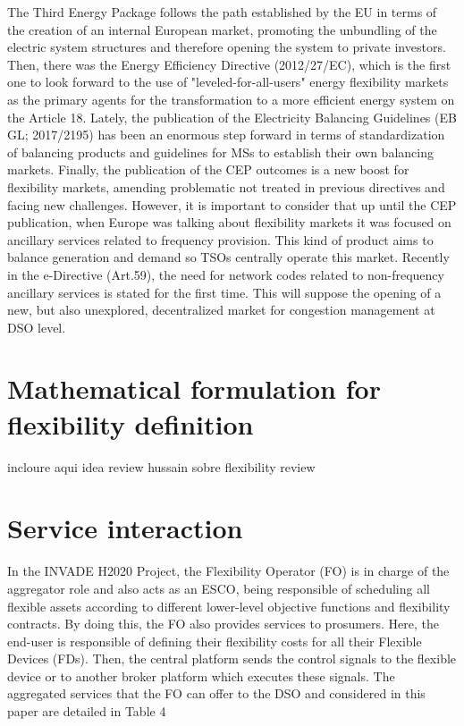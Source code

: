 The Third Energy Package follows the path established by the EU in terms of the creation of
an internal European market, promoting the unbundling of the electric system structures and therefore opening the system to private investors. Then, there was the Energy Efficiency Directive
(2012/27/EC), which is the first one to look forward to the use of "leveled-for-all-users"
energy flexibility markets as the primary agents for the transformation to a more efficient energy
system on the Article 18. Lately, the publication of the Electricity Balancing Guidelines (EB
GL; 2017/2195) has been an enormous step forward in terms of standardization of balancing
products and guidelines for MSs to establish their own balancing markets. Finally, the publication
of the CEP outcomes is a new boost for flexibility markets, amending problematic not
treated in previous directives and facing new challenges. 
However, it is important to consider that up until the CEP publication, when Europe was talking
about flexibility markets it was focused on ancillary services related to frequency provision.
This kind of product aims to balance generation and demand so TSOs centrally operate this market.
Recently in the e-Directive (Art.59), the need for network codes related to non-frequency
ancillary services is stated for the first time. This will suppose the opening of a new, but also
unexplored, decentralized market for congestion management at DSO level.

\section{Mathematical formulation for flexibility definition}
incloure aqui idea review hussain sobre flexibility review 


\section{Service interaction}
In the INVADE H2020 Project, the Flexibility Operator (FO) is in charge of the aggregator role and also acts as an ESCO, being responsible of scheduling all flexible assets according to different lower-level objective functions and flexibility contracts. By doing this, the FO also provides services to prosumers. Here, the end-user is responsible of defining their flexibility costs for all their Flexible Devices (FDs). Then, the central platform sends the control signals to the flexible device or to another broker platform which executes these signals. The aggregated services that the FO can offer to the DSO and considered in this paper are detailed in Table 4

